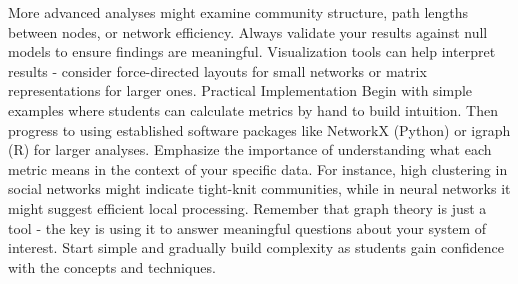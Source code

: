 More advanced analyses might examine community structure, path lengths between nodes, or network efficiency. Always validate your results against null models to ensure findings are meaningful. Visualization tools can help interpret results - consider force-directed layouts for small networks or matrix representations for larger ones.
Practical Implementation
Begin with simple examples where students can calculate metrics by hand to build intuition. Then progress to using established software packages like NetworkX (Python) or igraph (R) for larger analyses. Emphasize the importance of understanding what each metric means in the context of your specific data. For instance, high clustering in social networks might indicate tight-knit communities, while in neural networks it might suggest efficient local processing.
Remember that graph theory is just a tool - the key is using it to answer meaningful questions about your system of interest. Start simple and gradually build complexity as students gain confidence with the concepts and techniques.
